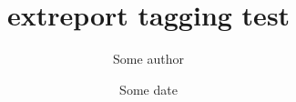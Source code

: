 \documentclass{extreport}
\title{extreport tagging test}
\author{Some author}
\date{Some date}
\begin{document}
\maketitle
\tableofcontents
\blinddocument
\end{document}
